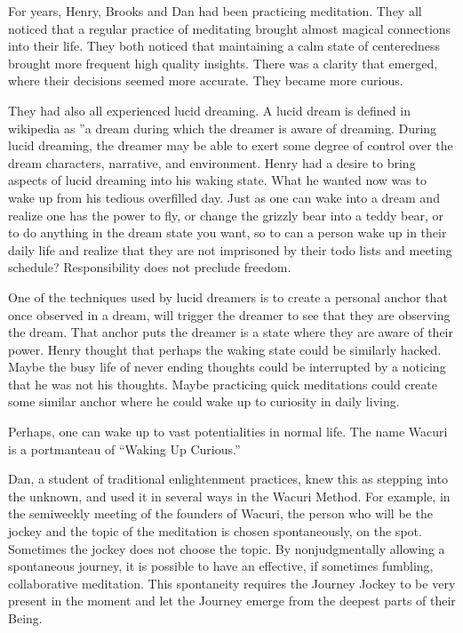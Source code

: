 \documentclass[12pt]{book}
\begin{document}
For years,  Henry, Brooks and Dan had been practicing meditation. They all noticed that a regular practice of meditating brought almost magical connections into their life. They both noticed that maintaining a calm state of centeredness brought more frequent high quality insights. There was a clarity that emerged, where their decisions seemed more accurate. They became more curious.

					
They had also all  experienced lucid dreaming. A lucid dream is defined in wikipedia as ”a dream during which the dreamer is aware of dreaming. During lucid dreaming, the dreamer may be able to exert some degree of control over the dream characters, narrative, and environment. Henry had a desire to bring aspects of lucid dreaming into his waking state. What he wanted now was to wake up from his tedious overfilled day. Just as one can wake into a dream and realize one has the power to fly, or change the grizzly bear into a teddy bear, or to do anything in the dream state you want, so to can a person wake up in their daily life and realize that they are not imprisoned by their todo lists and meeting schedule? Responsibility does not preclude freedom.
					
One of the techniques used by lucid dreamers is to create a personal anchor that once observed in a dream, will trigger the dreamer to see that they are observing the dream. That anchor puts the dreamer is a state where they are aware of their power. Henry thought that perhaps the waking state could be similarly hacked. Maybe the busy life of never ending thoughts could be interrupted by a noticing that he was not his thoughts. Maybe practicing quick meditations could create some similar anchor where he could wake up to curiosity in daily living.
					
Perhaps, one can wake up to vast potentialities in normal life. The name Wacuri is a portmanteau of “Waking Up Curious.”
					
Dan, a student of traditional enlightenment practices, knew this as stepping into the unknown, and used it in several ways in the Wacuri Method. For example, in the semiweekly meeting of the founders of Wacuri, the person who will be the jockey and the topic of the meditation is chosen spontaneously, on the spot. Sometimes the jockey does not choose the topic. By nonjudgmentally allowing a spontaneous journey, it is possible to have an effective, if sometimes fumbling, collaborative meditation. This spontaneity requires the Journey Jockey to be very present in the moment and let the Journey emerge from the deepest parts of their Being.
					
\end{document}

